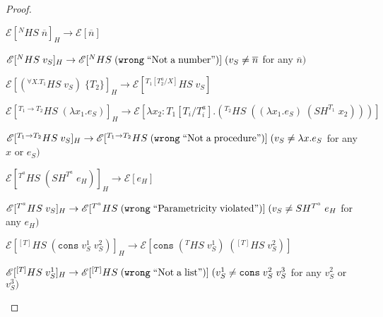\begin{theorem}
\begin{proof}
\begin{case}
\end{case}
\begin{case}
$\mathscr{E}[^{N}HS\;\overline{n}]_{H}\rightarrow\mathscr{E}[\overline{n}]$

\end{case}
\begin{case}
$\mathscr{E}[^{N}HS\;v_{S}]_{H}\rightarrow\mathscr{E}[^{N}HS\;(\mathtt{wrong}\;\mathrm{``Not\;a\;number"})]\;(v_{S}\neq\overline{n}$ for any $\overline{n})$

\end{case}
\begin{case}
$\mathscr{E}[(^{\forall X.T_{1}}HS\;v_{S})\;\lbrace T_{2}\rbrace]_{H}\rightarrow\mathscr{E}[^{T_{1}[T^{a}_{2}/X]}HS\;v_{S}]$

\end{case}
\begin{case}
$\mathscr{E}[^{T_{1}\rightarrow T_{2}}HS\;(\lambda x_{1}.e_{S})]_{H}\rightarrow\mathscr{E}[\lambda x_{2}:T_{1}[T_{i}/T^{a}_{i}].(^{T_{2}}HS\;((\lambda x_{1}.e_{S})\;(SH^{T_{1}}\;x_{2})))]$

\end{case}
\begin{case}
$\mathscr{E}[^{T_{1}\rightarrow T_{2}}HS\;v_{S}]_{H}\rightarrow\mathscr{E}[^{T_{1}\rightarrow T_{2}}HS\;(\mathtt{wrong}\;\mathrm{``Not\;a\;procedure"})]\;(v_{S}\neq\lambda x.e_{S}$ for any $x$ or $e_{S})$

\end{case}
\begin{case}
$\mathscr{E}[^{T^{a}}HS\;(SH^{T^{a}}\;e_{H})]_{H}\rightarrow\mathscr{E}[e_{H}]$

\end{case}
\begin{case}
$\mathscr{E}[^{T^{a}}HS\;v_{S}]_{H}\rightarrow\mathscr{E}[^{T^{a}}HS\;(\mathtt{wrong}\;\mathrm{``Parametricity\;violated"})]\;(v_{S}\neq SH^{T^{a}}\;e_{H}$ for any $e_{H})$

\end{case}
\begin{case}
$\mathscr{E}[^{[T]}HS\;(\mathtt{cons}\;v_{S}^{1}\;v_{S}^{2})]_{H}\rightarrow\mathscr{E}[\mathtt{cons}\;(^{T}HS\;v_{S}^{1})\;(^{[T]}HS\;v_{S}^{2})]$

\end{case}
\begin{case}
$\mathscr{E}[^{[T]}HS\;v_{S}^{1}]_{H}\rightarrow\mathscr{E}[^{[T]}HS\;(\mathtt{wrong}\;\mathrm{``Not\;a\;list"})]\;(v_{S}^{1}\neq\mathtt{cons}\;v_{S}^{2}\;v_{S}^{3}$ for any $v_{S}^{2}$ or $v_{S}^{3})$

\end{case}
\end{proof}
\end{theorem}